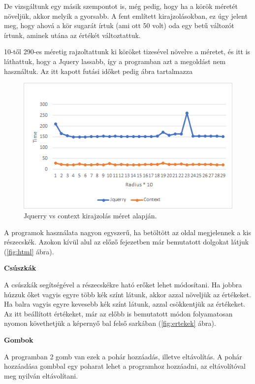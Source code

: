 De vizsgáltunk egy másik szempontot is, még pedig, hogy ha a körök méretét növeljük, akkor melyik a gyorsabb. A fent említett kirajzolásokban, ez úgy jelent meg, hogy ahová a kör sugarát írtuk (ami ott 50 volt) oda egy betű változót írtunk, aminek utána az értékét változtattuk.

10-től 290-es méretig rajzoltattunk ki köröket tizesével növelve a méretet, és itt is láthattuk, hogy a Jquery lassabb, így a programban azt a megoldást nem használtuk. Az itt kapott futási időket pedig  ábra tartalmazza


\begin{figure}[h]
	\centering
	\includegraphics[scale=1]{images/radius.png}
	\caption{Jquerry vs context kirajzolás méret alapján.}
	\label{fig:radius}
\end{figure}




A programok használata nagyon egyszerű, ha betöltött az oldal megjelennek a kis részecskék. Azokon kívül alul az előző fejezetben már bemutatott dolgokat látjuk (\ref{fig:html} ábra). 

\textbf{Csúszkák}

A csúszkák segítségével a részecskékre ható erőket lehet módosítani. Ha jobbra húzzuk őket vagyis egyre több kék színt látunk, akkor azzal növeljük az értékeket. Ha balra vagyis egyre kevesebb kék színt látunk, azzal csökkentjük az értékeket. Az itt beállított értékeket, már az előbb is bemutatott módon folyamatosan nyomon követhetjük a képernyő bal felső sarkában (\ref{fig:ertekek} ábra). 


\textbf{Gombok}

A programban 2 gomb van ezek a pohár hozzáadás, illetve eltávolítás. A pohár hozzáadása gombbal egy poharat lehet a programhoz hozzáadni, az eltávolítóval meg nyilván eltávolítani. 

